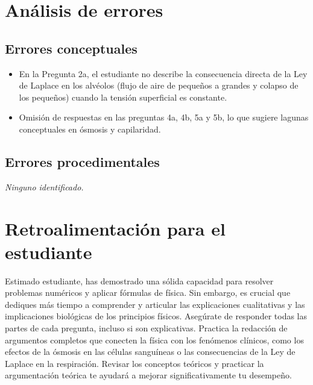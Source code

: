 \documentclass[11pt,a4paper]{article}
\begin{document}
\section*{Análisis de errores}

\subsection*{Errores conceptuales}
\begin{itemize}[leftmargin=1.5em, itemsep=2pt]
  \item En la Pregunta 2a, el estudiante no describe la consecuencia directa de la Ley de Laplace en los alvéolos (flujo de aire de pequeños a grandes y colapso de los pequeños) cuando la tensión superficial es constante.
  \item Omisión de respuestas en las preguntas 4a, 4b, 5a y 5b, lo que sugiere lagunas conceptuales en ósmosis y capilaridad.
\end{itemize}

\subsection*{Errores procedimentales}
\textit{Ninguno identificado.}

\section*{Retroalimentación para el estudiante}
\begin{tcolorbox}[cajaRecomendacion, title={Dirigido a: Daniela Escribano}]
Estimado estudiante, has demostrado una sólida capacidad para resolver problemas numéricos y aplicar fórmulas de física. Sin embargo, es crucial que dediques más tiempo a comprender y articular las explicaciones cualitativas y las implicaciones biológicas de los principios físicos. Asegúrate de responder todas las partes de cada pregunta, incluso si son explicativas. Practica la redacción de argumentos completos que conecten la física con los fenómenos clínicos, como los efectos de la ósmosis en las células sanguíneas o las consecuencias de la Ley de Laplace en la respiración. Revisar los conceptos teóricos y practicar la argumentación teórica te ayudará a mejorar significativamente tu desempeño.
\end{tcolorbox}

\end{document}
